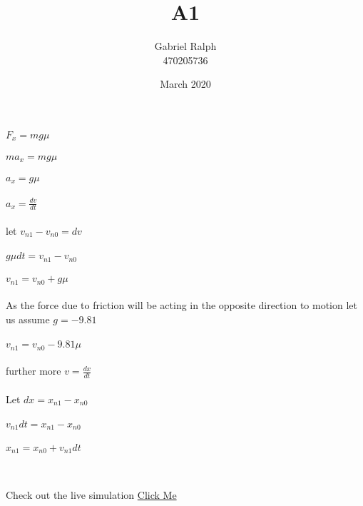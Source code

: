 \documentclass{article}
\title{A1}
\author{Gabriel Ralph \\ 470205736}
\date{March 2020}
\begin{document}
\maketitle

\section{}
\subsection{}

$F_x = mg\mu$\\ \\
$ma_x = mg\mu$\\ \\
$a_x = g\mu$\\ \\
$a_x = \frac{dv}{dt}$\\ \\
let $v_{n1} - v_{n0} = dv$\\ \\
$g\mu dt = v_{n1} - v_{n0}$\\ \\
$v_{n1} = v_{n0} + g\mu$\\ \\
As the force due to friction will be acting in the opposite direction to motion let us assume $g = -9.81$ \\ \\
$v_{n1} = v_{n0} - 9.81\mu$\\ \\
further more $v = \frac{dx}{dt}$\\ \\
Let $dx = x_{n1} - x_{n0}$ \\ \\
$v_{n1} dt = x_{n1} - x_{n0}$\\ \\
$x_{n1} = x_{n0} + v_{n1}dt$\\ \\
\subsection{}

\subsection{}

\subsection{}

Check out the live simulation \href{https://amme2500.galetora.com}{Click Me}
\newpage
\end{document}
